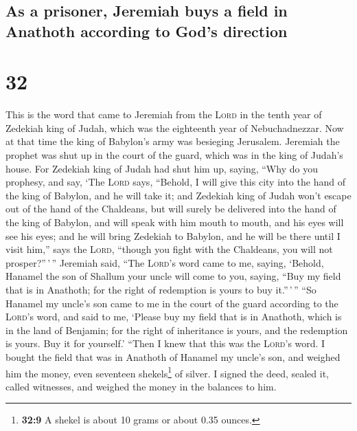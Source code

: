 \hypertarget{as-a-prisoner-jeremiah-buys-a-field-in-anathoth-according-to-gods-direction}{%
\subsection{As a prisoner, Jeremiah buys a field in Anathoth according
to God's
direction}\label{as-a-prisoner-jeremiah-buys-a-field-in-anathoth-according-to-gods-direction}}

\hypertarget{section-31}{%
\section{32}\label{section-31}}

 This is the word that came to Jeremiah from the
\textsc{Lord} in the tenth year of Zedekiah king of Judah, which was the
eighteenth year of Nebuchadnezzar.  Now at that time the
king of Babylon's army was besieging Jerusalem. Jeremiah the prophet was
shut up in the court of the guard, which was in the king of Judah's
house.  For Zedekiah king of Judah had shut him up,
saying, ``Why do you prophesy, and say, `The \textsc{Lord} says,
``Behold, I will give this city into the hand of the king of Babylon,
and he will take it;  and Zedekiah king of Judah won't
escape out of the hand of the Chaldeans, but will surely be delivered
into the hand of the king of Babylon, and will speak with him mouth to
mouth, and his eyes will see his eyes;  and he will bring
Zedekiah to Babylon, and he will be there until I visit him,'' says the
\textsc{Lord}, ``though you fight with the Chaldeans, you will not
prosper?''\,'\,''  Jeremiah said, ``The \textsc{Lord}'s
word came to me, saying,  `Behold, Hanamel the son of
Shallum your uncle will come to you, saying, ``Buy my field that is in
Anathoth; for the right of redemption is yours to buy it.''\,'\,''
 ``So Hanamel my uncle's son came to me in the court of
the guard according to the \textsc{Lord}'s word, and said to me, `Please
buy my field that is in Anathoth, which is in the land of Benjamin; for
the right of inheritance is yours, and the redemption is yours. Buy it
for yourself.' ``Then I knew that this was the \textsc{Lord}'s word.
 I bought the field that was in Anathoth of Hanamel my
uncle's son, and weighed him the money, even seventeen
shekels\footnote{\textbf{32:9} A shekel is about 10 grams or about 0.35
  ounces.} of silver.  I signed the deed, sealed it,
called witnesses, and weighed the money in the balances to him.
